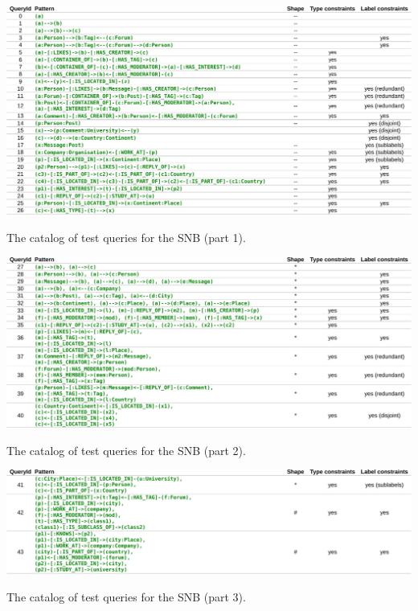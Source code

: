\begin{landscape}
  \begin{table}[h]
    \includegraphics[width=\linewidth]{tables/snb-query-catalog/query_catalog_1.pdf}
    \caption{The catalog of test queries for the SNB (part 1).}
    \label{table:query-catalog-1}
  \end{table}
  \begin{table}[h]
    \includegraphics[width=\linewidth]{tables/snb-query-catalog/query_catalog_2.pdf}
    \caption{The catalog of test queries for the SNB (part 2).}
    \label{table:query-catalog-2}
  \end{table}
  \begin{table}[h]
    \includegraphics[width=\linewidth]{tables/snb-query-catalog/query_catalog_3.pdf}
    \caption{The catalog of test queries for the SNB (part 3).}
    \label{table:query-catalog-3}
  \end{table}
\end{landscape}

